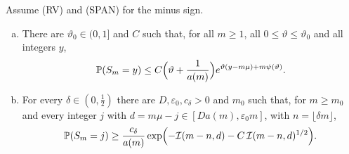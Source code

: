 \begin{lemma}\label{lem:tilt}
Assume (RV) and (SPAN) for the minus sign.
\begin{enumerate}[(a)]
\item There are $\vartheta_0\in(0,1]$ and $C$ such that, for all $m\ge1$, all
$0\le\vartheta\le\vartheta_0$ and all integers $y$,
\[
 \mathbb{P}(S_m=y)\le C\Bigl(\vartheta+\frac1{a(m)}\Bigr)e^{\vartheta(y-m\mu)+m\psi(\vartheta)} .
\]
\item For every $\delta\in(0,\frac12)$ there are $D,\varepsilon_0,c_\delta>0$ and $m_0$ such
that, for $m\ge m_0$ and every integer $j$ with $d=m\mu-j\in[Da(m),\varepsilon_0m]$,
with $n=\lfloor\delta m\rfloor$,
\[
 \mathbb{P}(S_m=j)\ge\frac{c_\delta}{a(m)}\exp\Bigl(-\mathcal I(m-n,d)-C\,\mathcal I(m-n,d)^{1/2}\Bigr).
\]
\end{enumerate}
\end{lemma}

